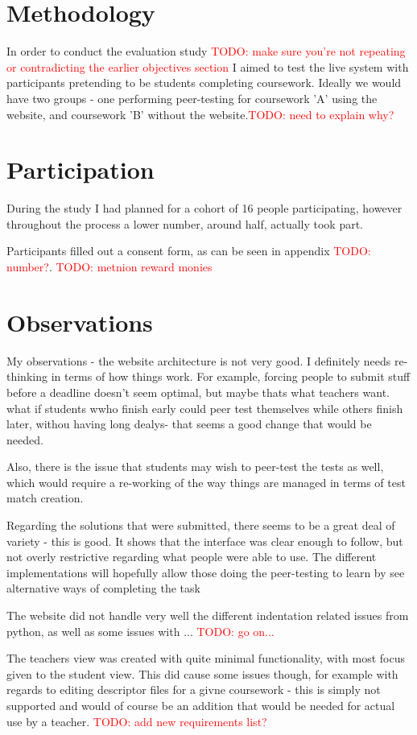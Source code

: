 \documentclass[a4paper,11pt]{report}
\newcommand{\todo}[1]{\textcolor{red}{TODO: #1}}
\begin{document}
\section{Methodology}
In order to conduct the evaluation study \todo{make sure you're not repeating or contradicting the earlier objectives section} I aimed to test the live system with participants pretending to be students completing coursework. Ideally we would have two groups - one performing peer-testing for coursework 'A' using the website, and coursework 'B' without the website.\todo{need to explain why?}
\section{Participation}
During the study I had planned for a cohort of 16 people participating, however throughout the process a lower number, around half, actually took part.\par
Participants filled out a consent form, as can be seen in appendix \todo{number?}.
\todo{metnion reward monies}
\section{Observations}
My observations - the website architecture is not very good. I definitely needs re-thinking in terms of how things work. For example, forcing people to submit stuff before a deadline doesn't seem optimal, but maybe thats what teachers want. what if students wwho finish early could peer test themselves while others finish later, withou having long dealys- that seems a good change that would be needed.\par
Also, there is the issue that students may wish to peer-test the tests as well, which would require a re-working of the way things are managed in terms of test match creation.\par
Regarding the solutions that were submitted, there seems to be a great deal of variety - this is good. It shows that the interface was clear enough to follow, but not overly restrictive regarding what people were able to use. The different implementations will hopefully allow those doing the peer-testing to learn by see alternative ways of completing the task\par
The website did not handle very well the different indentation related issues from python, as well as some issues with ... \todo{go  on...}\par
The teachers view was created with quite minimal functionality, with most focus given to the student view. This did cause some issues though, for example with regards to editing descriptor files for a givne coursework - this is simply not supported and would of course be an addition that would be needed for actual use by a teacher. \todo{add new requirements list?}
\end{document}
